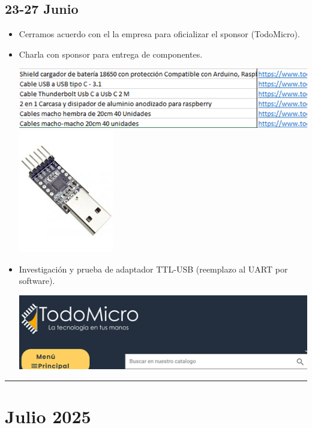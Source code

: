 \documentclass[12pt,a4paper]{article}
\newcommand{\separador}{\vspace{0.5cm}\noindent\rule{\linewidth}{0.5pt}\vspace{0.5cm}}
\begin{document}
\subsection*{23-27 Junio}

\begin{itemize}

\item Cerramos acuerdo con el la empresa para oficializar el sponsor (TodoMicro).

\item Charla con sponsor para entrega de componentes.

\includegraphics[width=0.7\linewidth]{Carpeta de campo/Imagen16.png}
\includegraphics[width=0.2\linewidth]{Carpeta de campo/Imagen17.png}

\item Investigación y prueba de adaptador TTL-USB (reemplazo al UART por software).

\includegraphics[width=0.7\linewidth]{Carpeta de campo/Imagen18.png}

\end{itemize}

\separador

\section*{Julio 2025}
\end{document}
